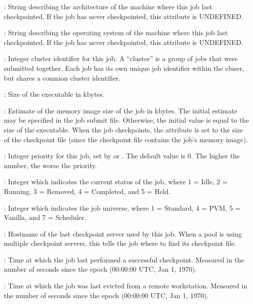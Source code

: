 \begin{description}
%
%
\item[\AdAttr{CkptArch}] : String describing the architecture of the machine
where this job last checkpointed.  If the job has never checkpointed,
this attribute is UNDEFINED.
%
\item[\AdAttr{CkptOpSys}] : String describing the operating system of
the machine where this job last checkpointed.  If the job has never
checkpointed, this attribute is UNDEFINED.
%
\item[\AdAttr{ClusterId}] : Integer cluster identifier for this job.
A ``cluster'' is a group of jobs that were submitted together.  Each
job has its own unique job identifier within the cluser, but shares a
common cluster identifier.
%
\item[\AdAttr{ExecutableSize}] : Size of the executable in kbytes.
%
\item[\AdAttr{ImageSize}] : Estimate of the memory image size of the
job in kbytes.  The initial estimate may be specified in the job
submit file.  Otherwise, the initial value is equal to the size of the
executable.  When the job checkpoints, the 
attribute is set to the size of the checkpoint file (since the
checkpoint file contains the job's memory image).
%
\item[\AdAttr{JobPrio}] : Integer priority for this job, set by
 or .  The default value is 0.  The higher
the number, the worse the priority.
%
\item[\AdAttr{JobStatus}] : Integer which indicates the current
status of the job, where 1 = Idle, 2 = Running, 3 = Removed, 4 =
Completed, and 5 = Held.
%
\item[\AdAttr{JobUniverse}] : Integer which indicates the job
universe, where 1 = Standard, 4 = PVM, 5 = Vanilla, and 7 = Scheduler.
%
\item[\AdAttr{LastCkptServer}] : Hostname of the last checkpoint
server used by this job.  When a pool is using multiple checkpoint
servers, this tells the job where to find its checkpoint file.
%
\item[\AdAttr{LastCkptTime}] : Time at which the job last performed a
successful checkpoint.  Measured in the number of seconds since the
epoch (00:00:00 UTC, Jan 1, 1970).
%
\item[\AdAttr{LastVacateTime}] : Time at which the job was last
evicted from a remote workstation.  Measured in the number of seconds
since the epoch (00:00:00 UTC, Jan 1, 1970).
%

\end{description}
